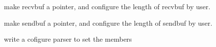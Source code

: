 
\begin{DoxyRefList}
\item[\label{todo__todo000002}%
\hypertarget{todo__todo000002}{}%
Member \hyperlink{structcsclient_a1ae9e95e2f7cb12d129776b0269ddae0}{csclient\+:\+:recvbuf} \mbox{[}M\+A\+X\+\_\+\+M\+S\+G\+\_\+\+L\+E\+N\mbox{]}]make recvbuf a pointer, and configure the length of recvbuf by user.  
\item[\label{todo__todo000001}%
\hypertarget{todo__todo000001}{}%
Member \hyperlink{structcsclient_a325006ca2b5e74fe78e00847974234e5}{csclient\+:\+:sendbuf} \mbox{[}M\+A\+X\+\_\+\+M\+S\+G\+\_\+\+L\+E\+N\mbox{]}]make sendbuf a pointer, and configure the length of sendbuf by user.  
\item[\label{todo__todo000003}%
\hypertarget{todo__todo000003}{}%
Class \hyperlink{structcsmsgpool}{csmsgpool} ]write a cofigure parser to set the members 
\end{DoxyRefList}